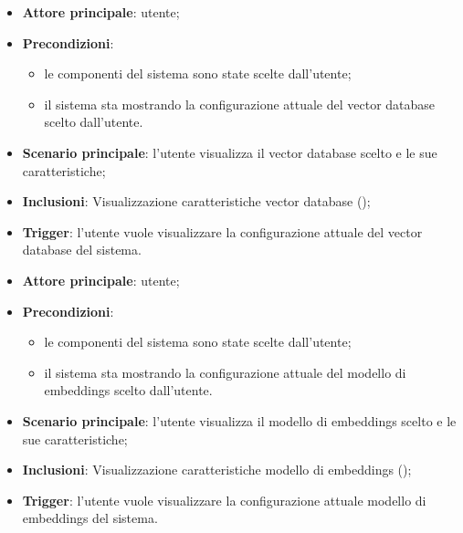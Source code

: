 \documentclass[10pt, a4paper]{article}
\begin{document}
    \begin{itemize}
        \item \textbf{Attore principale}: utente;
        \item \textbf{Precondizioni}: 
        \begin{itemize}
            \item le componenti del sistema sono state scelte dall'utente;
            \item il sistema sta mostrando la configurazione attuale del vector database scelto dall'utente.
        \end{itemize}
        \item \textbf{Scenario principale}: l’utente visualizza il vector database scelto e le sue caratteristiche;
        \item \textbf{Inclusioni}: Visualizzazione caratteristiche vector database ();
        \item \textbf{Trigger}: l’utente vuole visualizzare la configurazione attuale del vector database del sistema.
    \end{itemize}

    \begin{itemize}
        \item \textbf{Attore principale}: utente;
        \item \textbf{Precondizioni}: 
        \begin{itemize}
            \item le componenti del sistema sono state scelte dall'utente;
            \item il sistema sta mostrando la configurazione attuale del modello di embeddings scelto dall'utente.
        \end{itemize}
        \item \textbf{Scenario principale}: l’utente visualizza il modello di embeddings scelto e le sue caratteristiche;
        \item \textbf{Inclusioni}: Visualizzazione caratteristiche modello di embeddings ();
        \item \textbf{Trigger}: l’utente vuole visualizzare la configurazione attuale modello di embeddings del sistema.
    \end{itemize}
\end{document}
